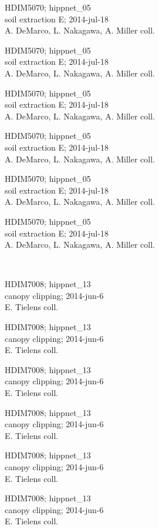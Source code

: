 \documentclass[2pt]{extarticle}
\begin{document}
\noindent
\parbox{0.16\textwidth}{\tiny \raggedright \rule[-0.3\baselineskip]{0pt}{10pt}HDIM5070; hippnet\_05\\ soil extraction E; 2014-jul-18\\ A. DeMarco, L. Nakagawa, A. Miller coll.}
\parbox{0.16\textwidth}{\tiny \raggedright \rule[-0.3\baselineskip]{0pt}{10pt}HDIM5070; hippnet\_05\\ soil extraction E; 2014-jul-18\\ A. DeMarco, L. Nakagawa, A. Miller coll.}
\parbox{0.16\textwidth}{\tiny \raggedright \rule[-0.3\baselineskip]{0pt}{10pt}HDIM5070; hippnet\_05\\ soil extraction E; 2014-jul-18\\ A. DeMarco, L. Nakagawa, A. Miller coll.}
\parbox{0.16\textwidth}{\tiny \raggedright \rule[-0.3\baselineskip]{0pt}{10pt}HDIM5070; hippnet\_05\\ soil extraction E; 2014-jul-18\\ A. DeMarco, L. Nakagawa, A. Miller coll.}
\parbox{0.16\textwidth}{\tiny \raggedright \rule[-0.3\baselineskip]{0pt}{10pt}HDIM5070; hippnet\_05\\ soil extraction E; 2014-jul-18\\ A. DeMarco, L. Nakagawa, A. Miller coll.}
\parbox{0.16\textwidth}{\tiny \raggedright \rule[-0.3\baselineskip]{0pt}{10pt}HDIM5070; hippnet\_05\\ soil extraction E; 2014-jul-18\\ A. DeMarco, L. Nakagawa, A. Miller coll.} \\ 
\vspace{0.001in} 

\noindent
\parbox{0.16\textwidth}{\tiny \raggedright \rule[-0.3\baselineskip]{0pt}{10pt}HDIM7008; hippnet\_13\\ canopy clipping; 2014-jun-6\\ E. Tielens coll.}
\parbox{0.16\textwidth}{\tiny \raggedright \rule[-0.3\baselineskip]{0pt}{10pt}HDIM7008; hippnet\_13\\ canopy clipping; 2014-jun-6\\ E. Tielens coll.}
\parbox{0.16\textwidth}{\tiny \raggedright \rule[-0.3\baselineskip]{0pt}{10pt}HDIM7008; hippnet\_13\\ canopy clipping; 2014-jun-6\\ E. Tielens coll.}
\parbox{0.16\textwidth}{\tiny \raggedright \rule[-0.3\baselineskip]{0pt}{10pt}HDIM7008; hippnet\_13\\ canopy clipping; 2014-jun-6\\ E. Tielens coll.}
\parbox{0.16\textwidth}{\tiny \raggedright \rule[-0.3\baselineskip]{0pt}{10pt}HDIM7008; hippnet\_13\\ canopy clipping; 2014-jun-6\\ E. Tielens coll.}
\parbox{0.16\textwidth}{\tiny \raggedright \rule[-0.3\baselineskip]{0pt}{10pt}HDIM7008; hippnet\_13\\ canopy clipping; 2014-jun-6\\ E. Tielens coll.} \\ 
\vspace{0.001in} 
\end{document}
